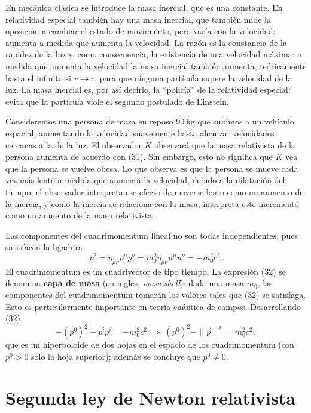 En mecánica clásica se introduce la masa inercial, que es una constante.
En relatividad especial también hay una masa inercial, que también mide
la oposición a cambiar el estado de movimiento, pero varía con la
velocidad: aumenta a medida que aumenta la velocidad. La razón es la
constancia de la rapidez de la luz y, como consecuencia, la existencia
de una velocidad máxima: a medida que aumenta la velocidad la masa
inercial también aumenta, teóricamente hasta el infinito si $v\to c$,
para que ninguna partícula supere la velocidad de la luz. La masa
inercial es, por así decirlo, la ``policía'' de la relatividad especial:
evita que la partícula viole el segundo postulado de Einstein.

\begin{observacion}
Consideremos una persona de masa en reposo $90\ \text{kg}$ que subimos a
un vehículo espacial, aumentando la velocidad suavemente hasta alcanzar
velocidades cercanas a la de la luz. El observador $K$ observará que la
masa relativista de la persona aumenta de acuerdo con (31). Sin embargo,
esto no significa que $K$ vea que la persona se vuelve obesa. Lo que
observa es que la persona se mueve cada vez más lento a medida que
aumenta la velocidad, debido a la dilatación del tiempo; el observador
interpreta ese efecto de moverse lento como un aumento de la inercia, y
como la inercia se relaciona con la masa, interpreta este incremento
como un aumento de la masa relativista.
\end{observacion}

Las componentes del cuadrimomentum lineal no son todas independientes,
pues satisfacen la ligadura
\[
p^2 = \eta_{\mu\nu}p^\mu p^\nu = m_0^2\eta_{\mu\nu}u^\mu u^\nu = -m_0^2c^2
. \tag{32}
\]
El cuadrimomentum es un cuadrivector de tipo tiempo. La expresión (32)
se denomina \textbf{capa de masa} (en inglés, \emph{mass shell}): dada
una masa $m_0$, las componentes del cuadrimomentum tomarán los valores
tales que (32) se satisfaga. Esto es particularmente importante en teoría
cuántica de campos. Desarrollando (32),
\[
-(p^0)^2+p^ip^i = -m_0^2c^2 \;\Longrightarrow\; (p^0)^2-\|\vec p\|^2 =
m_0^2c^2,
\]
que es un hiperboloide de dos hojas en el espacio de los
cuadrimomentum (con $p^0>0$ solo la hoja superior); además se concluye
que $p^0\neq0$.

\section{Segunda ley de Newton relativista}

